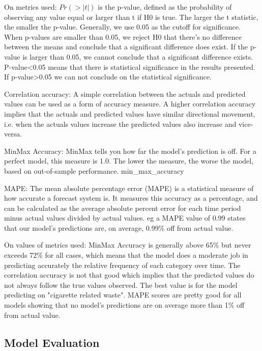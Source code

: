 \documentclass[10pt]{article}\usepackage[]{graphicx}\usepackage[]{color}
\begin{document}
On metrics used:
$Pr(>|t|)$ is the p-value, defined as the probability of observing any value equal or larger than t if H0 is true. The larger the t statistic, the smaller the p-value. Generally, we use 0.05 as the cutoff for significance. When p-values are smaller than 0.05, we reject H0 that there's no difference between the means and conclude that a significant difference does exist. If the p-value is larger than 0.05, we cannot conclude that a significant difference exists. P-value<0.05 means that there is statistical significance in the results presented. If p-value>0.05 we can not conclude on the statistical significance. 

Correlation accuracy:
A simple correlation between the actuals and predicted values can be used as a form of accuracy measure.
A higher correlation accuracy implies that the actuals and predicted values have similar directional movement, i.e. when the actuals values increase the predicted values also increase and vice-versa.

MinMax Accuracy:
MinMax tells you how far the model's prediction is off. For a perfect model, this measure is 1.0. The lower the measure, the worse the model, based on out-of-sample performance.
min\_max\_accuracy

MAPE:
The mean absolute percentage error (MAPE) is a statistical measure of how accurate a forecast system is. It measures this accuracy as a percentage, and can be calculated as the average absolute percent error for each time period minus actual values divided by actual values. 
eg a MAPE value of 0.99 states that our model's predictions are, on average, 0.99\% off from actual value.

On values of metrics used:
MinMax Accuracy is generally above 65\% but never exceeds 72\% for all cases, which means that the model does a moderate job in predicting accurately the relative frequency of each category over time.
The correlation accuracy is not that good which implies that the predicted values do not always follow the true values observed. The best value is for the model predicting on "cigarette related waste".
MAPE scores are pretty good for all models showing that no model's predictions are on average more than 1\% off from actual value. 




\subsection{Model Evaluation}
\end{document}
